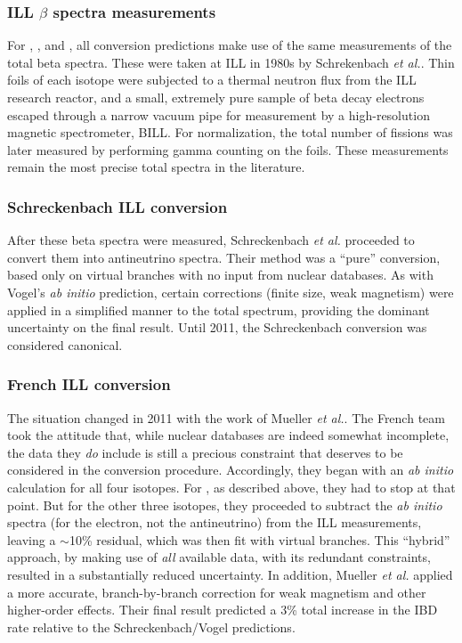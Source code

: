 \documentclass[../thesis.tex]{subfiles}
\begin{document}
\subsubsection{ILL $\beta$ spectra measurements}
\label{sec:illmeas}

For \urfive, \punine, and \puone, all conversion predictions make use of the same measurements of the total beta spectra. These were taken at ILL in 1980s by Schrekenbach \emph{et al.}. Thin foils of each isotope were subjected to a thermal neutron flux from the ILL research reactor, and a small, extremely pure sample of beta decay electrons escaped through a narrow vacuum pipe for measurement by a high-resolution magnetic spectrometer, BILL. For normalization, the total number of fissions was later measured by performing gamma counting on the foils. These measurements remain the most precise total spectra in the literature.

\subsubsection{Schreckenbach ILL conversion}
\label{sec:schreck}

After these beta spectra were measured, Schreckenbach \emph{et al.} proceeded to convert them into antineutrino spectra. Their method was a ``pure'' conversion, based only on virtual branches with no input from nuclear databases. As with Vogel's \ureight \emph{ab initio} prediction, certain corrections (finite size, weak magnetism) were applied in a simplified manner to the total spectrum, providing the dominant uncertainty on the final result. Until 2011, the Schreckenbach conversion was considered canonical.

\subsubsection{French ILL conversion}
\label{sec:frenchconv}

The situation changed in 2011 with the work of Mueller \emph{et al.}. The French team took the attitude that, while nuclear databases are indeed somewhat incomplete, the data they \emph{do} include is still a precious constraint that deserves to be considered in the conversion procedure. Accordingly, they began with an \emph{ab initio} calculation for all four isotopes. For \ureight, as described above, they had to stop at that point. But for the other three isotopes, they proceeded to subtract the \emph{ab initio} spectra (for the electron, not the antineutrino) from the ILL measurements, leaving a $\sim$10\% residual, which was then fit with virtual branches. This ``hybrid'' approach, by making use of \emph{all} available data, with its redundant constraints, resulted in a substantially reduced uncertainty. In addition, Mueller \emph{et al.} applied a more accurate, branch-by-branch correction for weak magnetism and other higher-order effects. Their final result predicted a 3\% total increase in the IBD rate relative to the Schreckenbach/Vogel predictions.
\end{document}
